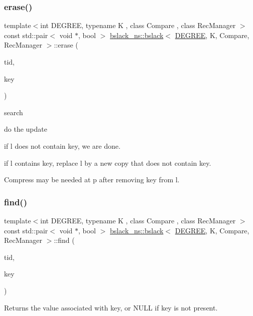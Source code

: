 \subsubsection{\texorpdfstring{erase()}{erase()}}
{\footnotesize\ttfamily template$<$int D\+E\+G\+R\+EE, typename K , class Compare , class Rec\+Manager $>$ \\
const std\+::pair$<$ void $\ast$, bool $>$ \hyperlink{classbslack__ns_1_1bslack}{bslack\+\_\+ns\+::bslack}$<$ \hyperlink{brown__sigouin__abtree__kcas_2adapter_8h_a5d88b17d70c985f2f2b8e987037fd6dd}{D\+E\+G\+R\+EE}, K, Compare, Rec\+Manager $>$\+::erase (\begin{DoxyParamCaption}\item[{const int}]{tid,  }\item[{const K \&}]{key }\end{DoxyParamCaption})}

search

do the update

if l does not contain key, we are done.

if l contains key, replace l by a new copy that does not contain key.

Compress may be needed at p after removing key from l.\mbox{\label{classbslack__ns_1_1bslack_a4be89aa4635a5abf4ffff92424e5786c}} 
\subsubsection{\texorpdfstring{find()}{find()}}
{\footnotesize\ttfamily template$<$int D\+E\+G\+R\+EE, typename K , class Compare , class Rec\+Manager $>$ \\
const std\+::pair$<$ void $\ast$, bool $>$ \hyperlink{classbslack__ns_1_1bslack}{bslack\+\_\+ns\+::bslack}$<$ \hyperlink{brown__sigouin__abtree__kcas_2adapter_8h_a5d88b17d70c985f2f2b8e987037fd6dd}{D\+E\+G\+R\+EE}, K, Compare, Rec\+Manager $>$\+::find (\begin{DoxyParamCaption}\item[{const int}]{tid,  }\item[{const K \&}]{key }\end{DoxyParamCaption})}

Returns the value associated with key, or N\+U\+LL if key is not present. \mbox{\label{classbslack__ns_1_1bslack_a22c3b23d443a031c6018f32c483f04c5}} 
